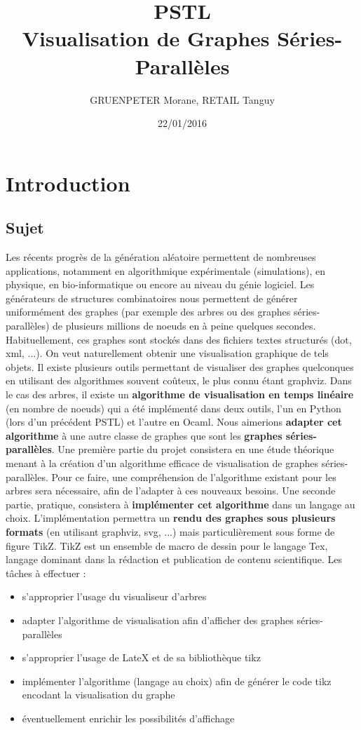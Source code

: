 \documentclass[11pt]{report}
\title{\textbf{PSTL \\ Visualisation de Graphes Séries-Parallèles}}
\author{GRUENPETER Morane, RETAIL Tanguy}
\date{22/01/2016}
\begin{document}
\maketitle
\tableofcontents
\newpage

\chapter{Introduction}
\section{Sujet}
Les récents progrès de la génération aléatoire permettent de nombreuses applications, notamment en algorithmique expérimentale (simulations), en physique, en bio-informatique ou encore au niveau du génie logiciel. Les générateurs de structures combinatoires nous permettent de générer uniformément des graphes (par exemple des arbres ou des graphes séries-parallèles) de plusieurs millions de noeuds en à peine quelques secondes. Habituellement, ces graphes sont stockés dans des fichiers textes structurés (dot, xml, ...). On veut naturellement obtenir une visualisation graphique de tels objets.
\newline
Il existe plusieurs outils permettant de visualiser des graphes quelconques en utilisant des algorithmes souvent coûteux, le plus connu étant graphviz. Dans le cas des arbres, il existe un \textbf{algorithme de visualisation en temps linéaire} (en nombre de noeuds) qui a été implémenté dans deux outils, l’un en Python (lors d’un précédent PSTL) et l’autre en Ocaml. Nous aimerions \textbf{adapter cet algorithme} à une autre classe de graphes que sont les \textbf{graphes séries-parallèles}. Une première partie du projet consistera en une étude théorique menant à la création d’un algorithme efficace de visualisation de graphes séries-parallèles. Pour ce faire, une compréhension de l’algorithme existant pour les arbres sera nécessaire, afin de l’adapter à ces nouveaux besoins. Une seconde partie, pratique, consistera à \textbf{implémenter cet algorithme} dans un langage au choix. L’implémentation permettra un \textbf{rendu des graphes sous plusieurs formats} (en utilisant graphviz, svg, ...) mais particulièrement sous forme de figure TikZ. TikZ est un ensemble de macro de dessin pour le langage Tex, langage dominant dans la rédaction et publication de contenu scientifique.
\newline
\newline
Les tâches à effectuer :
\begin{itemize}
    \item s’approprier l’usage du visualiseur d’arbres 
    \item adapter l’algorithme de visualisation afin d’afficher des graphes séries-parallèles 
    \item s’approprier l’usage de LateX et de sa bibliothèque tikz 
    \item implémenter l’algorithme (langage au choix) afin de générer le code tikz encodant la visualisation du graphe
    \item éventuellement enrichir les possibilités d’affichage
\end{itemize}
\end{document}

